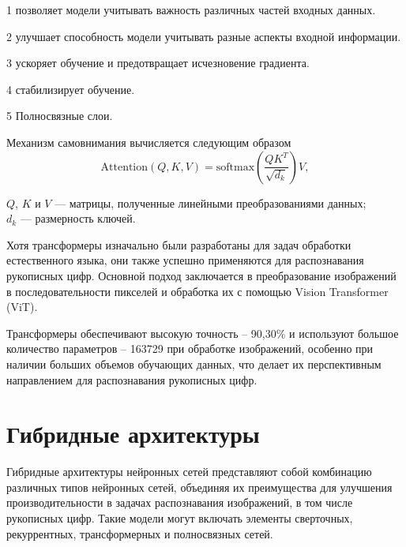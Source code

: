   1  позволяет модели учитывать 
важность различных частей входных данных.

  2  улучшает 
способность модели учитывать разные аспекты входной информации.

  3  ускоряет обучение и 
предотвращает исчезновение градиента.

  4  стабилизирует 
обучение.

  5 Полносвязные слои.

Механизм самовнимания вычисляется следующим образом
\begin{equation}
    \text{Attention}(Q, K, V) = \text{softmax}\left(\frac{QK^T}{\sqrt{d_k}}\right) V,
\end{equation}

 $Q$, $K$ и $V$ — матрицы, полученные линейными 
преобразованиями данных;\\
\hphantom{где} $d_k$ — размерность ключей.

\anonsection{}Хотя трансформеры изначально были разработаны для задач 
обработки естественного языка, они также успешно применяются для распознавания 
рукописных цифр. Основной подход заключается в преобразование изображений в 
последовательности пикселей и обработка их с помощью Vision Transformer (ViT).

Трансформеры обеспечивают высокую точность  – 90,30\% и используют большое 
количество параметров – 163729 при обработке изображений, особенно при наличии 
больших объемов обучающих данных, что делает их перспективным направлением для 
распознавания рукописных цифр\cite{Agrawal}.

\section{Гибридные архитектуры}\par
\hspace*{12.5 mm}Гибридные архитектуры нейронных сетей представляют собой 
комбинацию различных типов нейронных сетей, объединяя их преимущества для 
улучшения производительности в задачах распознавания изображений, в том числе 
рукописных цифр. Такие модели могут включать элементы сверточных, рекуррентных, 
трансформерных и полносвязных сетей.

